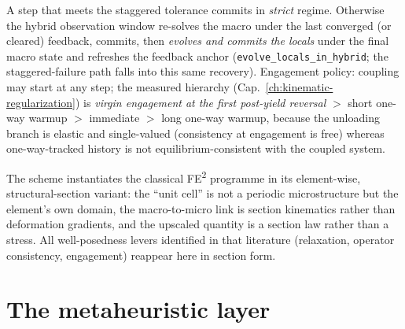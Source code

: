 \begin{definition}
A step that meets the staggered tolerance commits in
\emph{strict} regime. Otherwise the hybrid observation window
re-solves the macro under the last converged (or cleared) feedback,
commits, then \emph{evolves and commits the locals} under the final
macro state and refreshes the feedback anchor
(\texttt{evolve\_locals\_in\_hybrid}; the staggered-failure path
falls into this same recovery). Engagement policy: coupling may start
at any step; the measured hierarchy
(Cap.~\ref{ch:kinematic-regularization}) is \emph{virgin engagement
at the first post-yield reversal} $>$ short one-way warmup $>$
immediate $>$ long one-way warmup, because the unloading branch is
elastic and single-valued (consistency at engagement is free) whereas
one-way-tracked history is not equilibrium-consistent with the
coupled system.
\end{definition}

The scheme instantiates the classical FE\textsuperscript{2} programme
\cite{Feyel1999,FeyelandChaboche2000,Feyel2003,Miehe2002,Kouznetsova2004,Geers2010}
in its element-wise, structural-section variant: the ``unit cell'' is
not a periodic microstructure but the element's own domain, the
macro-to-micro link is section kinematics rather than deformation
gradients, and the upscaled quantity is a section law rather than a
stress. All well-posedness levers identified in that literature
(relaxation, operator consistency, engagement) reappear here in
section form.

\section{The metaheuristic layer}
\label{sec:tc-ca}

